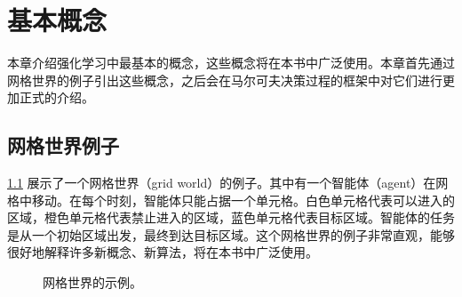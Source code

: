 \chapter{基本概念}
\label{ch:rl-basic}



本章介绍强化学习中最基本的概念，这些概念将在本书中广泛使用。本章首先通过网格世界的例子引出这些概念，之后会在马尔可夫决策过程的框架中对它们进行更加正式的介绍。

\section{网格世界例子}
\label{sec:rl-basic-grid-world}

\cref{fig:rl-basic-grid-world} 展示了一个网格世界（grid world）的例子。其中有一个智能体（agent）在网格中移动。在每个时刻，智能体只能占据一个单元格。白色单元格代表可以进入的区域，橙色单元格代表禁止进入的区域，蓝色单元格代表目标区域。智能体的任务是从一个初始区域出发，最终到达目标区域。这个网格世界的例子非常直观，能够很好地解释许多新概念、新算法，将在本书中广泛使用。

\begin{figure}[ht]
\centering
{}
\caption{网格世界的示例。}
\label{fig:rl-basic-grid-world}
\end{figure}


